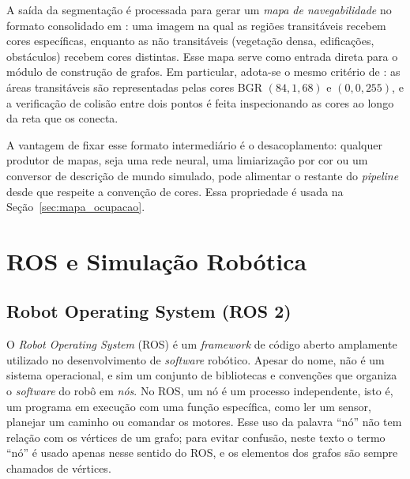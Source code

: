 \documentclass[
    12pt,
    openright,
    oneside,
    a4paper,
    english,
    brazil
]{abntex2}
\begin{document}
A saída da segmentação é processada para gerar um \emph{mapa de navegabilidade} no formato consolidado em \cite{junior2025_rrt}: uma imagem na qual as regiões transitáveis recebem cores específicas, enquanto as não transitáveis (vegetação densa, edificações, obstáculos) recebem cores distintas. Esse mapa serve como entrada direta para o módulo de construção de grafos. Em particular, adota-se o mesmo critério de \cite{junior2025_rrt}: as áreas transitáveis são representadas pelas cores BGR $(84, 1, 68)$ e $(0, 0, 255)$, e a verificação de colisão entre dois pontos é feita inspecionando as cores ao longo da reta que os conecta.

A vantagem de fixar esse formato intermediário é o desacoplamento: qualquer produtor de mapas, seja uma rede neural, uma limiarização por cor ou um conversor de descrição de mundo simulado, pode alimentar o restante do \textit{pipeline} desde que respeite a convenção de cores. Essa propriedade é usada na Seção~\ref{sec:mapa_ocupacao}.

\section{ROS e Simulação Robótica}

\subsection{Robot Operating System (ROS 2)}
\label{sec:ros2}

O \emph{Robot Operating System} (ROS) \cite{quigley2009} é um \textit{framework} de código aberto amplamente utilizado no desenvolvimento de \textit{software} robótico. Apesar do nome, não é um sistema operacional, e sim um conjunto de bibliotecas e convenções que organiza o \textit{software} do robô em \emph{nós}. No ROS, um nó é um processo independente, isto é, um programa em execução com uma função específica, como ler um sensor, planejar um caminho ou comandar os motores. Esse uso da palavra ``nó'' não tem relação com os vértices de um grafo; para evitar confusão, neste texto o termo ``nó'' é usado apenas nesse sentido do ROS, e os elementos dos grafos são sempre chamados de vértices.
\end{document}
